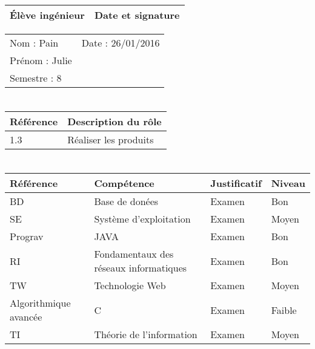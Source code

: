 \documentclass[11pt]{article}
\begin{document}

\begin{center}
\begin{table}[!hp]

	\begin{tabularx}{\linewidth}{|X|X|}
	\hline
	\rowcolor{gray!40} Élève ingénieur & Date et signature \\
	\hline
	\end{tabularx}
	\begin{tabularx}{\linewidth}{|X|X|}
	Nom : Pain & Date : 26/01/2016 \\ 
	Prénom : Julie & \\
	Semestre : 8 & \\
	\hline
	\end{tabularx}
\end{table}
\end{center}

\section*{\large\FR}

\begin{table}[!hp]
\centering
	\begin{tabularx}{\linewidth}{|X|X|}
	\hline
	\rowcolor{gray!40} Référence \WBSCourt & Description du rôle \\
	\hline
	 1.3 & Réaliser les produits \\
	 \hline
	\end{tabularx}
\end{table}


\section*{\large\FC}

\begin{table}[!hp]
\centering
	\begin{tabularx}{\linewidth}{|X|X|X|X|}
	\hline
	\rowcolor{gray!40} Référence & Compétence & Justificatif & Niveau \\
	\hline
	 BD & Base de donées & Examen & Bon \\
	\hline
	 SE & Système d'exploitation & Examen & Moyen \\
	\hline
	 Prograv & JAVA & Examen & Bon \\
	\hline
	 RI & Fondamentaux des réseaux informatiques & Examen & Bon \\
	\hline
	 TW & Technologie Web & Examen & Moyen \\
	\hline
	 Algorithmique avancée & C & Examen & Faible \\
	\hline
	TI & Théorie de l'information  & Examen & Moyen \\
	\hline
	\end{tabularx}
\end{table}
\end{document}
